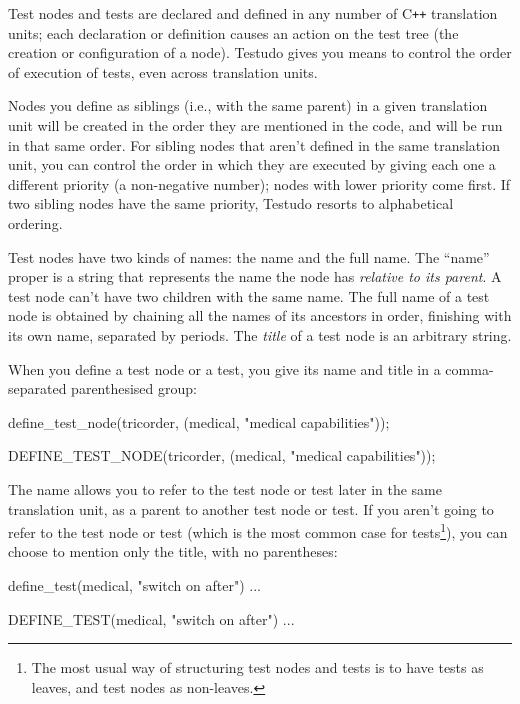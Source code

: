 \documentclass[twoside, a4paper, article]{memoir}
\newcommand*\Cpp{C\texttt{++}}
\begin{document}
Test nodes and tests are declared and defined in any number of \Cpp{}
translation units; each declaration or definition causes an action on the test
tree (the creation or configuration of a node).  Testudo gives you means to
control the order of execution of tests, even across translation units.

Nodes you define as siblings (i.e., with the same parent) in a given
translation unit will be created in the order they are mentioned in the code,
and will be run in that same order.  For sibling nodes that aren't defined in
the same translation unit, you can control the order in which they are executed
by giving each one a different priority (a non-negative number); nodes with
lower priority come first.  If two sibling nodes have the same priority,
Testudo resorts to alphabetical ordering.

Test nodes have two kinds of names: the name and the full name.  The ``name''
proper is a string that represents the name the node has \emph{relative to its
  parent}.  A test node can't have two children with the same name.  The full
name of a test node is obtained by chaining all the names of its ancestors in
order, finishing with its own name, separated by periods.  The \emph{title} of
a test node is an arbitrary string.

When you define a test node or a test, you give its name and title in a
comma-separated parenthesised group:
\begin{cpplisting}
define_test_node(tricorder,
                 (medical, "medical capabilities"));
\end{cpplisting}

\begin{cpplisting}
DEFINE_TEST_NODE(tricorder,
                 (medical, "medical capabilities"));
\end{cpplisting}

The name allows you to refer to the test node or test later in the same
translation unit, as a parent to another test node or test.  If you aren't
going to refer to the test node or test (which is the most common case for
tests\footnote{The most usual way of structuring test nodes and tests is to
  have tests as leaves, and test nodes as non-leaves.}), you can choose to
mention only the title, with no parentheses:
\begin{cpplisting}
define_test(medical, "switch on after") {
  ...
}
\end{cpplisting}

\begin{cpplisting}
DEFINE_TEST(medical, "switch on after")
{
  ...
}
\end{cpplisting}
\end{document}
